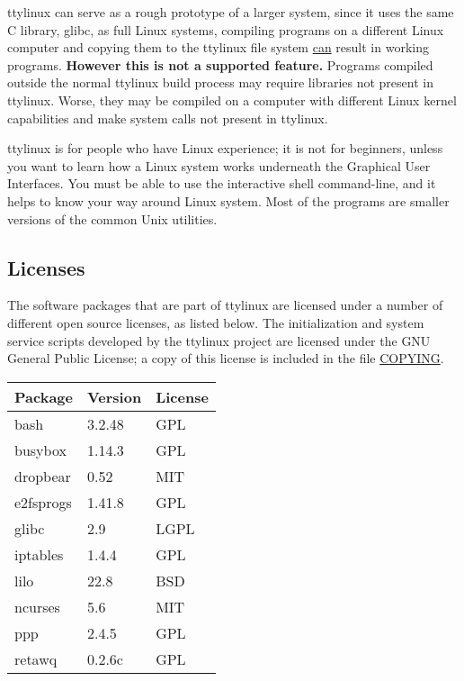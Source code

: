 \documentclass[10pt]{article}
\begin{document}
ttylinux can serve as a rough prototype of a larger system, since it uses the
same C library, glibc, as full Linux systems, compiling programs on a different
Linux computer and copying them to the ttylinux file system \underline{can}
result in working programs. {\bf However this is not a supported feature.}
Programs compiled outside the normal ttylinux build process may require
libraries not present in ttylinux. Worse, they may be compiled on a computer
with different Linux kernel capabilities and make system calls not present in
ttylinux.

ttylinux is for people who have Linux experience; it is not for beginners,
unless you want to learn how a Linux system works underneath the Graphical User
Interfaces. You must be able to use the interactive shell command-line, and it
helps to know your way around Linux system. Most of the programs are smaller
versions of the common Unix utilities.

\subsection{Licenses}

The software packages that are part of ttylinux are licensed under a number of
different open source licenses, as listed below. The initialization and system
service scripts developed by the ttylinux project are licensed under the GNU
General Public License; a copy of this license is included in the file
\url{COPYING}.

\begin{center}
\begin{tabular}{l|l|l}
Package      & Version & License \\
\hline
bash         & 3.2.48 & GPL  \\
busybox      & 1.14.3 & GPL  \\
dropbear     & 0.52   & MIT  \\
e2fsprogs    & 1.41.8 & GPL  \\
glibc        & 2.9    & LGPL \\
iptables     & 1.4.4  & GPL  \\
lilo         & 22.8   & BSD  \\
ncurses      & 5.6    & MIT  \\
ppp          & 2.4.5  & GPL  \\
retawq       & 0.2.6c & GPL  \\
\end{tabular}
\end{center}
\end{document}
